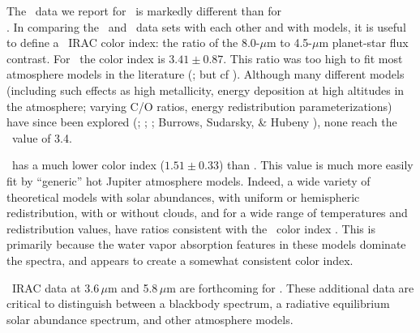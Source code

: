 The \spi\ data we report for \tresTwo\ is markedly different than for \tresOne\ \\ \citep{Charbonneau_Allen_Megeath:apj:2005a}.
In comparing the \tresTwo\ and \tresOne\ data sets with each other and with models, it is useful to define a \spi\ IRAC color index: the ratio of the 8.0-$\mu$m to 4.5-$\mu$m planet-star flux contrast.
For \tresOne\ the color index is \mbox{$3.41 \pm 0.87$}.
This ratio was too high to fit most atmosphere models in the literature (\citealp[see][]{Fortney_Marley_Lodders:apjl:2005a, Seager_Richardson_Hansen:apj:2005a, Barman_Hauschildt_Allard:apj:2005a};  but cf \citealt*{Burrows_Sudarsky_Hubeny:apj:2006a}).
Although many different models (including such effects as high metallicity, energy deposition at high altitudes in the atmosphere; varying C/O ratios, energy redistribution parameterizations) have since been explored (\citealp{Barman_Hauschildt_Allard:apj:2005a}; \citealp{Fortney_Marley_Lodders:apjl:2005a}; \citealp{Seager_Richardson_Hansen:apj:2005a};  Burrows, Sudarsky, \& Hubeny \citeyear{Burrows_Sudarsky_Hubeny:apj:2006a}), none reach the \tresOne\ value of 3.4.

\tresTwo\ has a much lower color index (\mbox{$1.51 \pm 0.33$}) than \tresOne.
This value is much more easily fit by ``generic'' hot Jupiter atmosphere models.
Indeed, a wide variety of theoretical models with solar abundances, with uniform or hemispheric redistribution, with or without clouds, and for a wide range of temperatures and redistribution values, have ratios consistent with the \tresTwo\ color index \citep[see, e.g.,][]{Fortney_Marley_Lodders:apjl:2005a, Barman_Hauschildt_Allard:apj:2005a, Charbonneau_Allen_Megeath:apj:2005a}.
This is primarily because the water vapor absorption features in these models dominate the spectra, and appears to create a somewhat consistent color index.

\spi\ IRAC data at 3.6\,$\mu$m and 5.8\,$\mu$m are forthcoming for \tresTwo.
These additional data are critical to distinguish between a blackbody spectrum, a radiative equilibrium solar abundance spectrum, and other atmosphere models.
